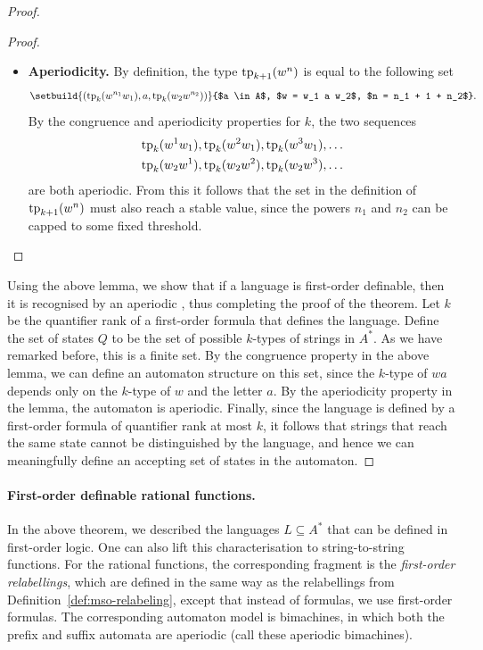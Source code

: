 \begin{proof}
\begin{proof}
\begin{itemize}
    \item \textbf{Aperiodicity.} By definition, the type  $\text{tp}_{k+1}(w^n)$ is equal to the following set
    \begin{align*}
    \setbuild{ (\fotype_k(w^{n_1} w_1), a, \fotype_k(w_2 w^{n_2}))}{$a \in A$, $w = w_1 a w_2$, $n = n_1 + 1 + n_2$}.
    \end{align*}
    By the congruence and aperiodicity properties for $k$, the two sequences 
    \begin{align*}
    \text{tp}_k(w^{1} w_1), \text{tp}_k(w^{2} w_1), \text{tp}_k(w^{3} w_1), \ldots \\
    \text{tp}_k(w_2 w^{1}), \text{tp}_k(w_2 w^{2}), \text{tp}_k(w_2 w^{3}), \ldots
    \end{align*}
    are both aperiodic. From this it follows that the set in the definition of $\text{tp}_{k+1}(w^n)$ must also reach a stable value, since the powers $n_1$ and $n_2$ can be capped to some fixed threshold.  
        \end{itemize}

    \end{proof}


Using the above lemma, we show that if a language is first-order definable, then it is recognised by an aperiodic \dfa, thus completing the proof of the theorem. Let $k$ be the quantifier rank of a first-order formula that defines the language. Define the set of states $Q$ to be the set of possible $k$-types of strings in $A^*$. As we have remarked before, this is a finite set. By the congruence property in the above lemma, we can define an automaton structure on this set, since the $k$-type of $wa$ depends only on the $k$-type of $w$ and the letter $a$. By the aperiodicity property in the lemma, the automaton  is aperiodic. Finally, since the language is defined by a first-order formula of quantifier rank at most $k$, it follows that strings that reach the same state cannot be distinguished by the language, and hence we can meaningfully define an accepting set of states in the automaton.
\end{proof}

\paragraph*{First-order definable rational functions.}
In the above theorem, we described the languages $L \subseteq A^*$ that can be defined in first-order logic. One can also lift this characterisation to string-to-string functions. For the rational functions, the corresponding fragment is the \emph{first-order relabellings}, which are defined in the same way as the \mso relabellings from Definition~\ref{def:mso-relabeling}, except that instead of \mso formulas, we use first-order formulas. The corresponding automaton model is bimachines, in which both the prefix and suffix automata are aperiodic (call these aperiodic bimachines). 

